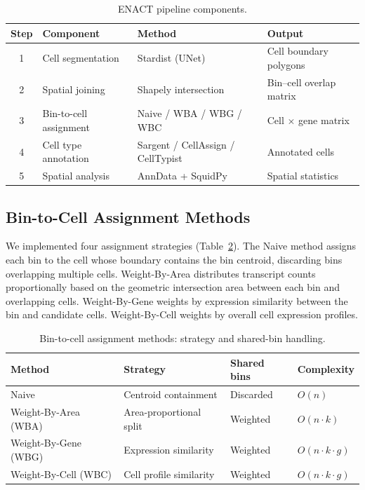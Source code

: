 \documentclass[11pt]{article}
\begin{document}
\begin{table}[H]
\centering
\caption{ENACT pipeline components.}
\label{tab:pipeline}
\begin{tabular}{clll}
\toprule
\textbf{Step} & \textbf{Component} & \textbf{Method} & \textbf{Output} \\
\midrule
1 & Cell segmentation & Stardist (UNet) & Cell boundary polygons \\
2 & Spatial joining & Shapely intersection & Bin--cell overlap matrix \\
3 & Bin-to-cell assignment & Naive / WBA / WBG / WBC & Cell $\times$ gene matrix \\
4 & Cell type annotation & Sargent / CellAssign / CellTypist & Annotated cells \\
5 & Spatial analysis & AnnData + SquidPy & Spatial statistics \\
\bottomrule
\end{tabular}
\end{table}

\subsection{Bin-to-Cell Assignment Methods}

We implemented four assignment strategies (Table~\ref{tab:methods}). The Naive method assigns each bin to the cell whose boundary contains the bin centroid, discarding bins overlapping multiple cells. Weight-By-Area distributes transcript counts proportionally based on the geometric intersection area between each bin and overlapping cells. Weight-By-Gene weights by expression similarity between the bin and candidate cells. Weight-By-Cell weights by overall cell expression profiles.

\begin{table}[H]
\centering
\caption{Bin-to-cell assignment methods: strategy and shared-bin handling.}
\label{tab:methods}
\begin{tabular}{llll}
\toprule
\textbf{Method} & \textbf{Strategy} & \textbf{Shared bins} & \textbf{Complexity} \\
\midrule
Naive & Centroid containment & Discarded & $O(n)$ \\
Weight-By-Area (WBA) & Area-proportional split & Weighted & $O(n \cdot k)$ \\
Weight-By-Gene (WBG) & Expression similarity & Weighted & $O(n \cdot k \cdot g)$ \\
Weight-By-Cell (WBC) & Cell profile similarity & Weighted & $O(n \cdot k \cdot g)$ \\
\bottomrule
\end{tabular}
\end{table}
\end{document}
